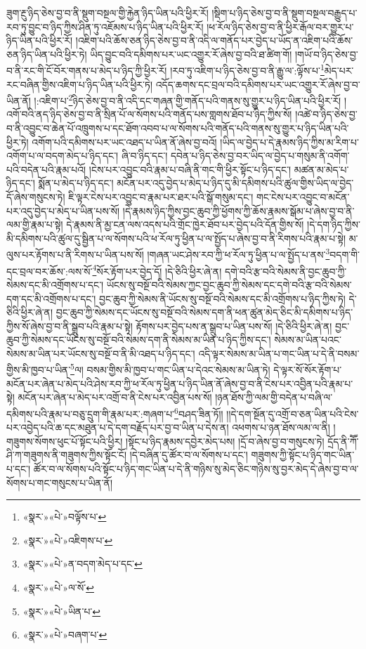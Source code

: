 ཟུག་རྔུ་ཉིད་ཅེས་བྱ་བ་ནི་སྡུག་བསྔལ་གྱི་རྐྱེན་ཉིད་ཡིན་པའི་ཕྱིར་རོ། །སྡིག་པ་ཉིད་ཅེས་བྱ་བ་ནི་སྡུག་བསྔལ་བརྒྱུད་པ་རབ་ཏུ་བྱུང་བ་ཉིད་ཀྱིས་ཤིན་ཏུ་འཇོམས་པ་ཉིད་ཡིན་པའི་ཕྱིར་རོ། །ཕ་རོལ་ཉིད་ཅེས་བྱ་བ་ནི་ཕྱིར་རྒོལ་བར་གྱུར་པ་ཉིད་ཡིན་པའི་ཕྱིར་རོ། །འཇིག་པའི་ཆོས་ཅན་ཉིད་ཅེས་བྱ་བ་ནི་འདི་ལ་གནོད་པར་བྱེད་པ་ཡོད་ན་འཇིག་པའི་ཆོས་ཅན་ཉིད་ཡིན་པའི་ཕྱིར་ཏེ། ཡིད་བྱུང་བའི་དམིགས་པར་ཡང་འགྱུར་རོ་ཞེས་བྱ་བའི་ཐ་ཚིག་གོ། །གཡོ་བ་ཉིད་ཅེས་བྱ་བ་ནི་རང་གི་ངོ་བོར་གནས་པ་མེད་པ་ཉིད་ཀྱི་ཕྱིར་རོ། །རབ་ཏུ་འཇིག་པ་ཉིད་ཅེས་བྱ་བ་ནི་རྒྱུ་ལ་:ལྟོས་པ་\footnote{«སྣར་»«པེ་»བལྟོས་པ་}མེད་པར་རང་བཞིན་གྱིས་འཇིག་པ་ཉིད་ཡིན་པའི་ཕྱིར་ཏེ། འདོད་ཆགས་དང་བྲལ་བའི་དམིགས་པར་ཡང་འགྱུར་རོ་ཞེས་བྱ་བ་ཡིན་ནོ། །:འཇིག་པ་\footnote{«སྣར་»«པེ་»འཇིགས་པ་}ཉིད་ཅེས་བྱ་བ་ནི་འདི་དང་གཞན་གྱི་གནོད་པའི་གནས་སུ་གྱུར་པ་ཉིད་ཡིན་པའི་ཕྱིར་རོ། །འགོ་བའི་ནད་ཉིད་ཅེས་བྱ་བ་ནི་སྲིན་པོ་ལ་སོགས་པའི་གནོད་པས་གླགས་ཐོབ་པ་ཉིད་ཀྱིས་སོ། །འཚེ་བ་ཉིད་ཅེས་བྱ་བ་ནི་འབྱུང་བ་ཆེན་པོ་འཁྲུགས་པ་དང་ཐོག་འབབ་པ་ལ་སོགས་པའི་གནོད་པའི་གནས་སུ་གྱུར་པ་ཉིད་ཡིན་པའི་ཕྱིར་ཏེ། འགོག་པའི་དམིགས་པར་ཡང་འཐད་པ་ཡིན་ནོ་ཞེས་བྱ་བའོ། །ཡིད་ལ་བྱེད་པ་དེ་རྣམས་ཉིད་ཀྱིས་མ་རིག་པ་འགོག་པ་ལ་བདག་མེད་པ་ཉིད་དང་། ཞི་བ་ཉིད་དང་། དབེན་པ་ཉིད་ཅེས་བྱ་བར་ཡིད་ལ་བྱེད་པ་གསུམ་ནི་འགོག་པའི་བདེན་པའི་རྣམ་པའོ། །ངེས་པར་འབྱུང་བའི་རྣམ་པ་བཞི་ནི་གང་གི་ཕྱིར་སྟོང་པ་ཉིད་དང་། མཚན་མ་མེད་པ་ཉིད་དང་། སྨོན་པ་མེད་པ་ཉིད་དང་། མངོན་པར་འདུ་བྱེད་པ་མེད་པ་ཉིད་དུ་མི་དམིགས་པའི་ཚུལ་གྱིས་ཡིད་ལ་བྱེད་དོ་ཞེས་གསུངས་ཏེ། ཇི་ལྟར་ངེས་པར་འབྱུང་བ་རྣམ་པར་ཐར་པའི་སྒོ་གསུམ་དང་། གང་ངེས་པར་འབྱུང་བ་མངོན་པར་འདུ་བྱེད་པ་མེད་པ་ཡིན་པས་སོ། །དེ་རྣམས་ཉིད་ཀྱིས་བྱང་ཆུབ་ཀྱི་ཕྱོགས་ཀྱི་ཆོས་རྣམས་སྒོམ་པ་ཞེས་བྱ་བ་ནི་ལམ་གྱི་རྣམ་པ་སྟེ། དེ་རྣམས་ནི་མྱ་ངན་ལས་འདས་པའི་གྲོང་ཁྱེར་ཐོབ་པར་བྱེད་པའི་དོན་གྱིས་སོ། །དེ་དག་ཉིད་ཀྱིས་མི་དམིགས་པའི་ཚུལ་དུ་སྦྱིན་པ་ལ་སོགས་པའི་ཕ་རོལ་ཏུ་ཕྱིན་པ་ལ་སྤྱོད་པ་ཞེས་བྱ་བ་ནི་རིགས་པའི་རྣམ་པ་སྟེ། མ་ལུས་པར་རྟོགས་པ་ནི་རིགས་པ་ཡིན་པས་སོ། །གཞན་ཡང་ཤེས་རབ་ཀྱི་ཕ་རོལ་ཏུ་ཕྱིན་པ་ལ་སྤྱོད་པ་ནས་\footnote{«སྣར་»«པེ་»ན་བདག་མེད་པ་དང་}བདག་གི་དང་བྲལ་བར་ཆོས་:ལས་སོ་\footnote{«སྣར་»«པེ་»ལ་སོ་}སོར་རྟོག་པར་བྱེད་དོ། །དེ་ཅིའི་ཕྱིར་ཞེ་ན། དགེ་བའི་རྩ་བའི་སེམས་ནི་བྱང་ཆུབ་ཀྱི་སེམས་དང་མི་འགྲོགས་པ་དང་། ཡོངས་སུ་བསྔོ་བའི་སེམས་ཀྱང་བྱང་ཆུབ་ཀྱི་སེམས་དང་དགེ་བའི་རྩ་བའི་སེམས་དག་དང་མི་འགྲོགས་པ་དང་། བྱང་ཆུབ་ཀྱི་སེམས་ནི་ཡོངས་སུ་བསྔོ་བའི་སེམས་དང་མི་འགྲོགས་པ་ཉིད་ཀྱིས་ཏེ། དེ་ཅིའི་ཕྱིར་ཞེ་ན། བྱང་ཆུབ་ཀྱི་སེམས་དང་ཡོངས་སུ་བསྔོ་བའི་སེམས་དག་ནི་ཕན་ཚུན་མེད་ཅིང་མི་དམིགས་པ་ཉིད་ཀྱིས་སོ་ཞེས་བྱ་བ་ནི་སྒྲུབ་པའི་རྣམ་པ་སྟེ། རྟོགས་པར་བྱེད་པས་ན་སྒྲུབ་པ་ཡིན་པས་སོ། །དེ་ཅིའི་ཕྱིར་ཞེ་ན། བྱང་ཆུབ་ཀྱི་སེམས་དང་ཡོངས་སུ་བསྔོ་བའི་སེམས་དག་ནི་སེམས་མ་ཡིན་པ་ཉིད་ཀྱིས་དང་། སེམས་མ་ཡིན་པའང་སེམས་མ་ཡིན་པར་ཡོངས་སུ་བསྔོ་བ་ནི་མི་འཐད་པ་ཉིད་དང་། འདི་ལྟར་སེམས་མ་ཡིན་པ་གང་ཡིན་པ་དེ་ནི་བསམ་གྱིས་མི་ཁྱབ་པ་ཡིན་\footnote{«སྣར་»«པེ་»ཡིན་པ་}ལ། བསམ་གྱིས་མི་ཁྱབ་པ་གང་ཡིན་པ་དེའང་སེམས་མ་ཡིན་ཏེ། དེ་ལྟར་སོ་སོར་རྟོག་པ་མངོན་པར་ཞེན་པ་མེད་པའི་ཤེས་རབ་ཀྱི་ཕ་རོལ་ཏུ་ཕྱིན་པ་ཉིད་ཡིན་ནོ་ཞེས་བྱ་བ་ནི་ངེས་པར་འབྱིན་པའི་རྣམ་པ་སྟེ། མངོན་པར་ཞེན་པ་མེད་པར་འགྲོ་བ་ནི་ངེས་པར་འབྱིན་པས་སོ། །ཉན་ཐོས་ཀྱི་ལམ་གྱི་བདེན་པ་བཞི་ལ་དམིགས་པའི་རྣམ་པ་བཅུ་དྲུག་གི་རྣམ་པར་:གཞག་པ་\footnote{«སྣར་»«པེ་»བཞག་པ་}བཤད་ཟིན་ཏོ།། །།དེ་དག་སྔོན་དུ་འགྲོ་བ་ཅན་ཡིན་པའི་ངེས་པར་འབྱེད་པའི་ཆ་དང་མཐུན་པ་དེ་དག་བརྗོད་པར་བྱ་བ་ཡིན་པ་དེས་ན། འཕགས་པ་ཉན་ཐོས་ལམ་ལ་ནི། །གཟུགས་སོགས་ཕུང་པོ་སྟོང་པའི་ཕྱིར། །སྟོང་པ་ཉིད་རྣམས་དབྱེར་མེད་པས། །དྲོ་བ་ཞེས་བྱ་བ་གསུངས་ཏེ། དྲོད་ནི་ཀཽ་ཤི་ཀ་གཟུགས་ནི་གཟུགས་ཀྱིས་སྟོང་ངོ། །དེ་བཞིན་དུ་ཚོར་བ་ལ་སོགས་པ་དང་། གཟུགས་ཀྱི་སྟོང་པ་ཉིད་གང་ཡིན་པ་དང་། ཚོར་བ་ལ་སོགས་པའི་སྟོང་པ་ཉིད་གང་ཡིན་པ་དེ་ནི་གཉིས་སུ་མེད་ཅིང་གཉིས་སུ་བྱར་མེད་དེ་ཞེས་བྱ་བ་ལ་སོགས་པ་གང་གསུངས་པ་ཡིན་ནོ། 